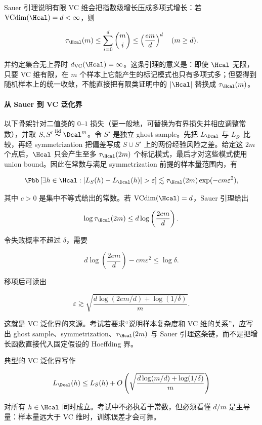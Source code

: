 Sauer 引理说明有限 VC 维会把指数级增长压成多项式增长：若 \(\operatorname{VCdim}(\Hcal)=d<\infty\)，则

\[
  \tau_{\Hcal}(m)
  \le
  \sum_{i=0}^{d}\binom{m}{i}
  \le
  \left(\frac{em}{d}\right)^d
  \quad (m\ge d).
\]

并约定集合无上界时 \(d_{\mathrm{VC}}(\Hcal)=\infty\)。这条引理的意义是：即使 \(\Hcal\) 无限，只要 VC 维有限，在 \(m\) 个样本上它能产生的标记模式也只有多项式多；但要得到随机样本上的统一收敛，不能直接把有限类证明中的 \(|\Hcal|\) 替换成 \(\tau_{\Hcal}(m)\)。

\paragraph{从 Sauer 到 VC 泛化界}

\proofsketchlabel 以下骨架针对二值类的 \(0\)--\(1\) 损失（更一般地，可替换为有界损失并相应调整常数），并取 \(S,S'\overset{\mathrm{iid}}{\sim}\Dcal^m\)。令 \(S'\) 是独立 ghost sample。先把 \(L_{\Dcal}\) 与 \(L_{S'}\) 比较，再经 symmetrization 把偏差写成 \(S\cup S'\) 上的两份经验风险之差。给定这 \(2m\) 个点后，\(\Hcal\) 只会产生至多 \(\tau_{\Hcal}(2m)\) 个标记模式，最后才对这些模式使用 union bound。因此在常数与满足 symmetrization 前提的样本量范围内，有

\[
  \Pbb\left[
    \exists h\in\Hcal:
    |L_S(h)-L_{\Dcal}(h)|>\varepsilon
  \right]
  \lesssim
  \tau_{\Hcal}(2m)\exp(-c m\varepsilon^2),
\]

其中 \(c>0\) 是集中不等式给出的常数。若 \(\operatorname{VCdim}(\Hcal)=d\)，Sauer 引理给出

\[
  \log \tau_{\Hcal}(2m)
  \le
  d\log\left(\frac{2em}{d}\right).
\]

令失败概率不超过 \(\delta\)，需要

\[
  d\log\left(\frac{2em}{d}\right)
  -
  c m\varepsilon^2
  \le
  \log\delta.
\]

移项后可读出

\[
  \varepsilon
  \gtrsim
  \sqrt{
    \frac{
      d\log(2em/d)+\log(1/\delta)
    }{m}
  }.
\]

这就是 VC 泛化界的来源。考试若要求“说明样本复杂度和 VC 维的关系”，应写出 ghost sample、symmetrization、\(\tau_{\Hcal}(2m)\) 与 Sauer 引理这条链，而不是把增长函数直接代入固定假设的 Hoeffding 界。

典型的 VC 泛化界写作

\[
  L_{\Dcal}(h)
  \le
  L_S(h)
  +
  O\left(
    \sqrt{\frac{d\log(m/d)+\log(1/\delta)}{m}}
  \right)
\]

对所有 \(h\in\Hcal\) 同时成立。考试中不必执着于常数，但必须看懂 \(d/m\) 是主导量：样本量远大于 VC 维时，训练误差才会可靠。


